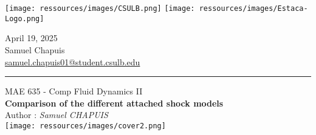 \documentclass{article}
\begin{document}
\noindent
\begin{minipage}[t]{0.5\textwidth}
  \vspace{0pt}
  \texttt{[image: ressources/images/CSULB.png]}\hspace{0.3cm}
  \texttt{[image: ressources/images/Estaca-Logo.png]}
  \bigskip
\end{minipage}
\begin{minipage}[t]{0.5\textwidth}
  \vspace{8pt}
  \raggedleft
  April 19, 2025 \\
  Samuel Chapuis \\
  \href{mailto:samuel.chapuis01@student.csulb.edu}{samuel.chapuis01@student.csulb.edu} 
\end{minipage}




\rule{\linewidth}{1pt}

\begin{center}
	{\large MAE 635 - Comp Fluid Dynamics II} %
		\\[1.5cm]
		{\LARGE \textbf{Comparison of the different attached shock models}} %
		\\[0.5cm]
		Author : \textit{Samuel CHAPUIS}\\[2.5cm]

		\center 
		\texttt{[image: ressources/images/cover2.png]}
\end{center}

\newpage




\newpage
\tableofcontents



\cite{Supaero}


% 

% 
\end{document}
